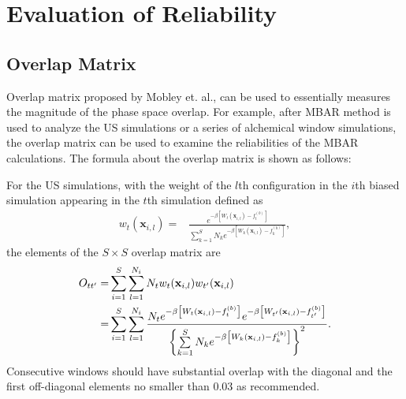 \chapter{Evaluation of Reliability\label{chapter:Eva}}
\section{Overlap Matrix\label{Sec:Eva:OM}}
Overlap matrix proposed by Mobley et. al.,\cite{KlimovichJCAMD2015} can be used to essentially measures the magnitude of the phase space overlap. For example, after MBAR method is used to analyze the US simulations or a series of alchemical window simulations, the overlap matrix can be used to examine the reliabilities of the MBAR calculations. The formula about the overlap matrix is shown as follows:

For the US simulations, with the weight of the $l$th configuration in the $i$th biased simulation appearing in the $t$th simulation defined as
\begin{align}
	w_{t}(\textbf{x}_{i,l})
	=&\frac{e^{-\beta \left[W_{t}(\textbf{x}_{i,l})-f_{t}^{(b)}\right]}}{\sum\limits_{k=1}^{S}N_{k}e^{-\beta\left[W_{k}(\textbf{x}_{i,l})-f_{k}^{(b)}\right]}},
	\label{Eq:weight3} 
\end{align}
the elements of the $S \times S$ overlap matrix are\cite{KlimovichJCAMD2015}
\begin{align}
	O_{tt^{\prime}} =&\sum\limits_{i=1}^{S}\sum\limits_{l=1}^{N_{i}}N_tw_{t}(\textbf{x}_{i,l})w_{t^\prime}(\textbf{x}_{i,l})\notag\\
	=&
	\sum\limits_{i=1}^{S}\sum\limits_{l=1}^{N_{i}}
	\frac{N_{t}e^{-\beta\left[W_{t}(\textbf{x}_{i,l})-f_{t}^{(b)}\right]}e^{-\beta \left[W_{t^{\prime}}(\textbf{x}_{i,l})-f_{t^{\prime}}^{(b)}\right]}}{\left\{\sum\limits_{k=1}^{S}N_{k}e^{-\beta\left[W_{k}(\textbf{x}_{i,l})-f_{k}^{(b)}\right]}\right\}^2}.
	\label{Eq:OM}
\end{align}
Consecutive windows should have substantial overlap with the diagonal and the first off-diagonal elements no smaller than 0.03 as recommended\cite{KlimovichJCAMD2015}. 


